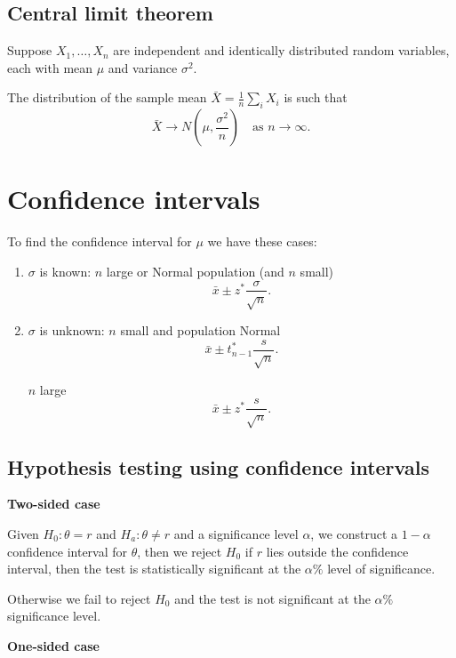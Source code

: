 \documentclass[10pt, a4paper]{article}
\begin{document}
\subsection{Central limit theorem}
\begin{theorem}
    Suppose $X_1, \dotsc, X_n$ are independent and identically distributed random variables,
    each with mean $\mu$ and variance $\sigma ^ 2$.

    The distribution of the sample mean $\bar{X} = \frac{1}{n}\sum_{i}X_i$ is such that
    \[
    \bar{X} \to N\left(\mu, \frac{\sigma ^ 2}{n}\right)\quad\text{as } n \to \infty.
    \]
\end{theorem}

\newpage

\section{Confidence intervals}

To find the confidence interval for $\mu$ we have these cases:
\begin{enumerate}[label = (\roman*)]
    \item 
    $\sigma$ is known:
    $n$ large or Normal population
    (and $n$ small)
    \[
    \bar{x} \pm z ^ {*}\frac{\sigma}{\sqrt{n}}.
    \]

    \item
    $\sigma$ is unknown:
    $n$ small and population Normal
    \[
    \bar{x} \pm t_{n - 1} ^ {*}\frac{s}{\sqrt{n}}.
    \]

    $n$ large
    \[
    \bar{x} \pm z ^ {*}\frac{s}{\sqrt{n}}.
    \]
\end{enumerate}

\subsection{Hypothesis testing using confidence intervals}

\textbf{Two-sided case}

Given $H_0 : \theta = r$ and $H_a : \theta \neq r$ and a significance level $\alpha$,
we construct a $1 - \alpha$ confidence interval for $\theta$,
then we reject $H_0$ if $r$ lies outside the confidence interval,
then the test is statistically significant at the $\alpha\%$ level of significance.

Otherwise we fail to reject $H_0$ and the test is not significant at the $\alpha\%$ significance level.

\textbf{One-sided case}
\end{document}
